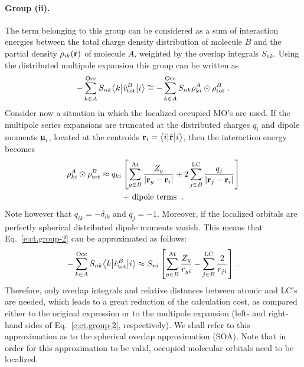 \paragraph{Group (ii).}
The term belonging to this group can be considered as a sum of interaction
energies between the total charge density distribution of molecule $B$
and the partial density $\rho_{ik}({\bf r})$ of molecule $A$,
weighted by the overlap integrals $S_{nk}$. Using the distributed multipole 
expansion this group can be written as
%
\begin{equation} \label{e:ct.group-2}
      - \sum_{k\in A}^{\rm Occ} S_{nk} \bigl\langle {k} \bigl\lvert {\hat{v}^B_{\rm tot} } \bigl\lvert {i} \bigr\rangle 
 \cong - \sum_{k\in A}^{\rm Occ} S_{nk} \rho_{ki}^A \odot \rho^B_{\rm tot} \;.
\end{equation}
%
Consider now a situation in which the localized occupied MO's are used.
If the multipole series expansions are truncated
at the distributed charges $q_i$ and dipole moments ${\bm{\upmu}_i}$, 
located at the centroids ${\bf r}_i = \bigl\langle {i} \bigl\lvert {\hat{\bf r}} \bigl\lvert {i} \bigr\rangle$, 
then the interaction energy becomes
%
\begin{multline}
 \rho_{ki}^A \odot \rho^B_{\rm tot} 
 \approx 
 q_{ki} 
 \left[
 \sum_{y\in B}^{\rm At}
  \frac{Z_y}{\vert {\bf r}_y - {\bf r}_i \vert } 
 +
 2\sum_{j\in B}^{\rm LC}
  \frac{q_j}{\vert {\bf r}_j - {\bf r}_i \vert } 
 \right] \\
 + \text{ dipole terms } \;.
\end{multline}
%
Note however that $q_{ik} = -\delta_{ik}$ and $q_j = -1$. Moreover, 
if the localized orbitals are perfectly spherical distributed dipole moments vanish.
This means that Eq.~\eqref{e:ct.group-2} can be approximated as follows:
%
\begin{equation} \label{e:ct.group-ii.final}
      - \sum_{k\in A}^{\rm Occ} S_{nk} \bigl\langle {k} \bigl\lvert {\hat{v}^B_{\rm tot} } \bigl\lvert {i} \bigr\rangle 
 \approx S_{ni}  \left[
 \sum_{y\in B}^{\rm At}
  \frac{Z_y}{ r_{yi} } 
 -
 \sum_{j\in B}^{\rm LC}
  \frac{2}{r_{ji}} 
 \right] \;.
\end{equation}
%
Therefore, only overlap integrals and relative distances between
atomic and LC's are needed, which leads to a great reduction of the
calculation cost,
as compared either to the original expression or to the multipole expansion (left\hyp{} and right\hyp{}hand sides
of Eq.~\eqref{e:ct.group-2}, respectively).
We shall refer to this approximation as to
the spherical overlap approximation (SOA). Note that in order for this approximation to be valid,
occupied molecular orbitals need to be localized.

